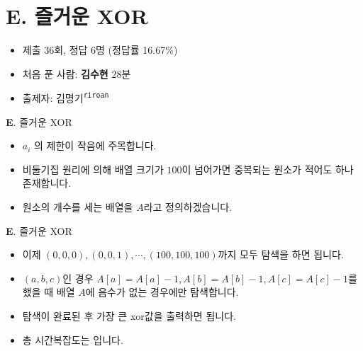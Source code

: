 \section{E. 즐거운 XOR}

\begin{frame} %
    \begin{itemize}
    	\item 제출 36회, 정답 6명 (정답률 16.67\%)
    	\item 처음 푼 사람: \textbf{김수현} 28분
        \item 출제자: 김명기\textsuperscript{\color{kupc-gray}\texttt{riroan}}
    \end{itemize}
\end{frame}

\begin{frame}{\textbf{E}. 즐거운 XOR}
    \begin{itemize}
		\item $a_i$ 의 제한이 작음에 주목합니다.
		\item 비둘기집 원리에 의해 배열 크기가 $100$이 넘어가면 중복되는 원소가 적어도 하나 존재합니다.
		\item 원소의 개수를 세는 배열을 $A$라고 정의하겠습니다.
	\end{itemize}
\end{frame}

\begin{frame}{\textbf{E}. 즐거운 XOR}
	\begin{itemize}
		\item 이제 $(0,0,0), (0,0,1), \cdots , (100,100,100)$까지 모두 탐색을 하면 됩니다.
		\item $(a, b, c)$인 경우 $A[a]=A[a]-1, A[b]=A[b]-1, A[c]=A[c]-1$를 했을 때 배열 $A$에 음수가 없는 경우에만 탐색합니다.
		\item 탐색이 완료된 후 가장 큰 xor값을 출력하면 됩니다.
		\item 총 시간복잡도는 입니다.
	\end{itemize}
\end{frame}